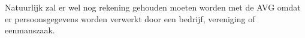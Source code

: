 Natuurlijk zal er wel nog rekening gehouden moeten worden met de AVG omdat er persoonsgegevens worden verwerkt door een bedrijf, vereniging of eenmanszaak. \autocite{gba2019videoparlofoon}







